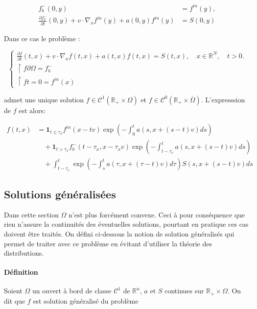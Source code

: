 \documentclass[onecolumn, 12pt, a4paper]{article}
\begin{document}
\[
\begin{aligned}
f_b^-(0,y) &= f^{in}(y), \\
\frac{\partial f_b^-}{\partial t}(0,y) + v \cdot \nabla_x f^{in}(y) + a(0,y)f^{in}(y)&=S(0,y)
\end{aligned}
\]



Dans ce cas le problème :

\[
\begin{cases}
\frac{\partial f}{\partial t}(t,x)+v \cdot \nabla_x f(t,x)+ a(t,x)f(t,x)=S(t,x), \quad x \in \mathbb{R}^N, \quad t>0.\\
\restriction{f}{\partial \Omega}= f_b^-\\
\restriction{f}{t=0}= f^{in}(x)
\end{cases}
\]

admet une unique solution $f \in \mathcal{C}^1(\mathbb{R}_+ \times \Omega)$ et $f \in \mathcal{C}^0(\mathbb{R}_+ \times \overline{\Omega})$. L'expresssion de $f$ est alors:



\[
\boxed{
\begin{aligned}
f(t,x) &= \mathbf{1}_{t \leq \tau_x} f^{in} (x-tv) \exp\left(-\int_0^t a(s,x+(s-t)v)ds\right) \\
&\quad + \mathbf{1}_{t > \tau_x} f_b^- (t-\tau_x,x-\tau_x v) \exp\left(-\int_{t-\tau_x}^t a(s,x+(s-t)v)ds\right) \\
&\quad + \int_{t-\tau_x}^t \exp\left(-\int_{s}^{t}a(\tau,x+(\tau-t)v)d\tau\right) S(s,x+(s-t)v)ds
\end{aligned}}
\]


\subsection{Solutions généralisées}
Dans cette section $\Omega$ n'est plus forcément convexe. Ceci à pour conséquence que rien n'assure la continuités des éventuelles solutions, pourtant en pratique ces cas doivent être traités. On défini ci-dessous la notion de solution généralisés qui permet de traiter avec ce problème en évitant d'utiliser la théorie des distributions.


\paragraph{Définition}

Soient $\Omega$ un ouvert à bord de classe $\mathcal{C}^1$ de $\mathbb{R}^n$, $a$ et $S$ continues sur $\mathbb{R}_+ \times \Omega$. On dit que $f$ est solution généralisé du problème 
\end{document}
